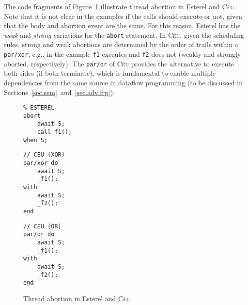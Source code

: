 \documentclass{acm_proc_article-sp}
\newcommand{\CEU}{\textsc{C\'{e}u}\xspace}
\newcommand{\code}[1] {{\small{\texttt{#1}}}}
\newcommand{\1}{\;}
\newcommand{\2}{\;\;}
\newcommand{\3}{\;\;\;}
\newcommand{\5}{\;\;\;\;\;}
\begin{document}
The code fragments of Figure~\ref{lst.abortion} illustrate thread abortion in 
Esterel and \CEU.
Note that it is not clear in the examples if the calls should execute or not, 
given that the body and abortion event are the same.
For this reason, Esterel has the \emph{weak} and \emph{strong} variations for 
the \code{abort} statement.
In \CEU, given the scheduling rules, strong and weak abortions are determined 
by the order of trails within a \code{par/xor}, e.g., in the example \code{f1} 
executes and \code{f2} does not (weakly and strongly aborted, respectively).
%
The \code{par/or} of \CEU provides the alternative to execute both sides (if 
both terminate), which is fundamental to enable multiple dependencies from the 
same source in dataflow programming (to be discussed in
Sections~\ref{sec.sem}~and~\ref{sec.adv.frp}).
%

\begin{figure}[t]
\begin{minipage}[t]{0.35\linewidth}
\begin{lstlisting}
% ESTEREL
abort
    await S;
    call f1();
when S;
\end{lstlisting}
\end{minipage}
%
\begin{minipage}[t]{0.30\linewidth}
\begin{lstlisting}
// CEU (XOR)
par/xor do
    await S;
    _f1();
with
    await S;
    _f2();
end
\end{lstlisting}
\end{minipage}
%
\begin{minipage}[t]{0.30\linewidth}
\begin{lstlisting}
// CEU (OR)
par/or do
    await S;
    _f1();
with
    await S;
    _f2();
end
\end{lstlisting}
\end{minipage}
\caption{ Thread abortion in Esterel and \CEU. %
\label{lst.abortion}
}
\end{figure}
\begin{comment}
{\small
With strong abortion (default in Esterel), the call to \code{f1} is not 
executed (the \code{abort} can instead be prefixed with the \code{weak} 
keyword).
In \CEU, the \code{par/xor} provides strong and weak abortion depending on the 
chosen order for the trails.
The \code{par/or} provides XXX.
}
\end{comment}
\end{document}
